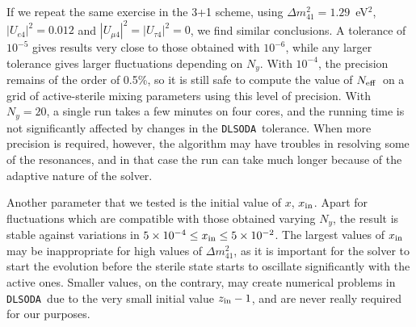 \documentclass[notitlepage,nofootinbib,showpacs,preprintnumbers,amsmath,amssymb,superscriptaddress,prd,onecolumn]{revtex4-1}
\newcommand{\Neff}{\ensuremath{N_{\rm eff}}}
\newcommand{\dmsq}[1]{\ensuremath{\Delta m^2_{#1}}}
\newcommand{\uasq}[1]{\ensuremath{|U_{#1 4}|^2}}
\newcommand{\e}[1]{\ensuremath{\times10^{#1}}}
\newcommand{\dlsoda}{\texttt{DLSODA}}
\begin{document}
If we repeat the same exercise in the 3+1 scheme,
using $\dmsq{41}=1.29$~eV$^2$,
$\uasq{e}=0.012$ \cite{Gariazzo:2018mwd} and $\uasq{\mu}=\uasq{\tau}=0$,
we find similar conclusions.
A tolerance of $10^{-5}$ gives results very close to those obtained with $10^{-6}$,
while any larger tolerance gives larger fluctuations depending on $N_y$.
With $10^{-4}$, the precision remains of the order of 0.5\%, so it is still safe to compute the value of \Neff\ on a grid of active-sterile mixing parameters
using this level of precision.
With $N_y=20$, a single run takes a few minutes on four cores, and the running time is not significantly affected
by changes in the \dlsoda\ tolerance.
When more precision is required, however, the algorithm may have troubles in resolving some of the resonances,
and in that case the run can take much longer because of the adaptive nature of the solver.

Another parameter that we tested is the initial value of $x$, $x_{\rm in}$.
Apart for fluctuations which are compatible with those obtained varying $N_y$,
the result is stable against variations in $5\e{-4}\leq x_{\rm in}\leq5\e{-2}$.
The largest values of $x_{\rm in}$ may be inappropriate for high values of \dmsq{41},
as it is important for the solver to start the evolution before the sterile state
starts to oscillate significantly with the active ones.
Smaller values, on the contrary, may create numerical problems in \dlsoda\
due to the very small initial value $z_{\rm in}-1$,
and are never really required for our purposes.
\end{document}
